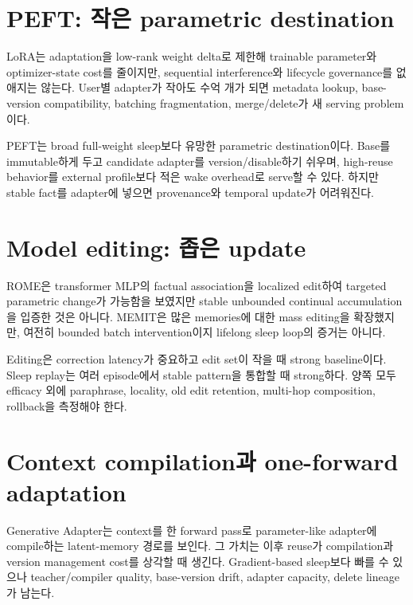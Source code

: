 \section{PEFT: 작은 parametric destination}

LoRA는 adaptation을 low-rank weight delta로 제한해 trainable parameter와 optimizer-state cost를 줄이지만,
sequential interference와 lifecycle governance를 없애지는 않는다.
\parencite{srcstc0030,srcstc0036} User별 adapter가 작아도 수억 개가 되면 metadata lookup, base-version
compatibility, batching fragmentation, merge/delete가 새 serving problem이다.

PEFT는 broad full-weight sleep보다 유망한 parametric destination이다. Base를 immutable하게 두고 candidate
adapter를 version/disable하기 쉬우며, high-reuse behavior를 external profile보다 적은 wake overhead로
serve할 수 있다. 하지만 stable fact를 adapter에 넣으면 provenance와 temporal update가 어려워진다.

\section{Model editing: 좁은 update}

ROME은 transformer MLP의 factual association을 localized edit하여 targeted parametric change가 가능함을
보였지만 stable unbounded continual accumulation을 입증한 것은 아니다.
\parencite{srcstc0032} MEMIT은 많은 memories에 대한 mass editing을 확장했지만, 여전히 bounded batch
intervention이지 lifelong sleep loop의 증거는 아니다. \parencite{srcstc0033}

Editing은 correction latency가 중요하고 edit set이 작을 때 strong baseline이다. Sleep replay는 여러
episode에서 stable pattern을 통합할 때 strong하다. 양쪽 모두 efficacy 외에 paraphrase, locality, old edit
retention, multi-hop composition, rollback을 측정해야 한다.

\section{Context compilation과 one-forward adaptation}

Generative Adapter는 context를 한 forward pass로 parameter-like adapter에 compile하는 latent-memory 경로를
보인다. 그 가치는 이후 reuse가 compilation과 version management cost를 상각할 때 생긴다.
 \parencite{srcstc0027} Gradient-based sleep보다 빠를 수 있으나 teacher/compiler quality,
base-version drift, adapter capacity, delete lineage가 남는다.

